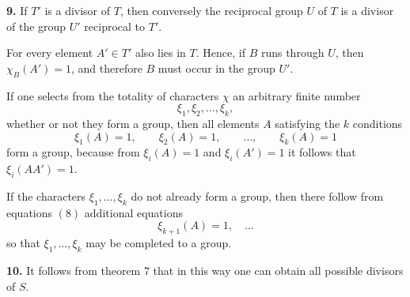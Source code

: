 \documentclass[11pt]{article}
\begin{document}
\medskip
\noindent\textbf{9.} If \(T'\) is a divisor of \(T\), then conversely the reciprocal group \(U\) of \(T\) is a divisor of the group \(U'\) reciprocal to \(T'\).

\medskip
For every element \(A'\in T'\) also lies in \(T\). Hence, if \(B\) runs through \(U\), then \(\chi_B(A')=1\), and therefore \(B\) must occur in the group \(U'\).

If one selects from the totality of characters \(\chi\) an arbitrary finite number
\[
\xi_1,\xi_2,\dots,\xi_k,
\]
whether or not they form a group, then all elements \(A\) satisfying the \(k\) conditions
\[
\xi_1(A)=1,\qquad
\xi_2(A)=1,\qquad
\dots,\qquad
\xi_k(A)=1
\tag{8}
\]
form a group, because from \(\xi_i(A)=1\) and \(\xi_i(A')=1\) it follows that \(\xi_i(AA')=1\).

If the characters \(\xi_1,\dots,\xi_k\) do not already form a group, then there follow from equations \((8)\) additional equations
\[
\xi_{k+1}(A)=1,\quad \dots
\]
so that \(\xi_1,\dots,\xi_k\) may be completed to a group.

\medskip
\noindent\textbf{10.} It follows from theorem 7 that in this way one can obtain all possible divisors of \(S\).

\medskip
\end{document}
